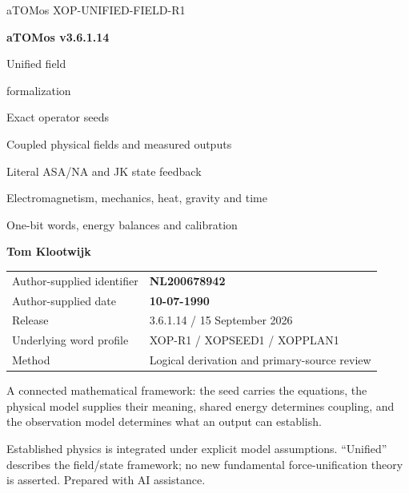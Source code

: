 

\begin{titlepage}\thispagestyle{empty}
{\sffamily\color{accent}\large aTOMos \hfill XOP-UNIFIED-FIELD-R1}\par
\vspace{17mm}
{\sffamily\bfseries\fontsize{40}{48}\selectfont\color{ink}aTOMos v3.6.1.14}\par
\vspace{10mm}
{\sffamily\fontsize{34}{41}\selectfont Unified field\par formalization}\par
\vspace{10mm}
{\sffamily\fontsize{19}{25}\selectfont\color{gold}Exact operator seeds\par Coupled physical fields and measured outputs}\par
\vspace{12mm}
{\large Literal ASA/NA and JK state feedback\par
Electromagnetism, mechanics, heat, gravity and time\par
One-bit words, energy balances and calibration}\par
\vspace{15mm}
{\sffamily\bfseries\Large Tom Klootwijk}\par
\begin{tabular}{@{}ll@{}}
Author-supplied identifier & \textbf{NL200678942}\\
Author-supplied date & \textbf{10-07-1990}\\
Release & 3.6.1.14 / 15 September 2026\\
Underlying word profile & XOP-R1 / XOPSEED1 / XOPPLAN1\\
Method & Logical derivation and primary-source review\\
\end{tabular}
\vfill
\begin{panel}
A connected mathematical framework: the seed carries the equations, the
physical model supplies their meaning, shared energy determines coupling,
and the observation model determines what an output can establish.
\end{panel}
{\small\color{muted}Established physics is integrated under explicit model
assumptions. ``Unified'' describes the field/state framework; no new fundamental
force-unification theory is asserted. Prepared with AI assistance.}
\end{titlepage}
\setcounter{page}{2}

\tableofcontents\clearpage











\appendix


